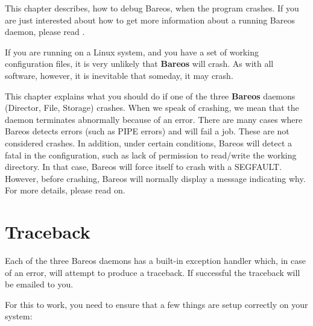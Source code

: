

This chapter describes, how to debug Bareos, when the program crashes.
If you are just interested about how to get more information about a running Bareos daemon,
please read .

If you are running on a Linux system, and you have a set of working
configuration files, it is very unlikely that {\bf Bareos} will crash. As with
all software, however, it is inevitable that someday, it may crash.

This chapter explains what you should do if one of the three {\bf Bareos}
daemons (Director, File, Storage) crashes.  When we speak of crashing, we
mean that the daemon terminates abnormally because of an error.  There are
many cases where Bareos detects errors (such as PIPE errors) and will fail
a job. These are not considered crashes.  In addition, under certain
conditions, Bareos will detect a fatal in the configuration, such as
lack of permission to read/write the working directory. In that case,
Bareos will force itself to crash with a SEGFAULT. However, before
crashing, Bareos will normally display a message indicating why.
For more details, please read on.

\section{Traceback}

Each of the three Bareos daemons has a built-in exception handler which, in
case of an error, will attempt to produce a traceback. If successful the
traceback will be emailed to you.

For this to work, you need to ensure that a few things are setup correctly on
your system:

